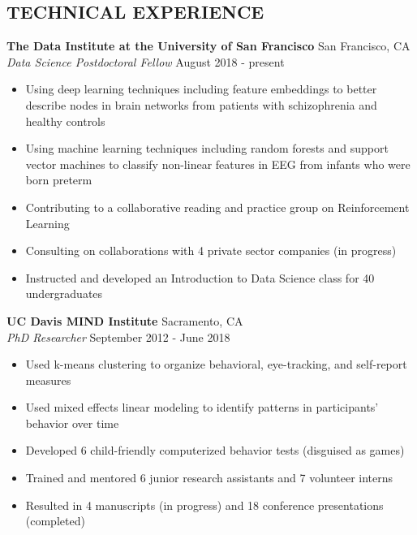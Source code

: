 \documentclass[line,margin,10pt]{res}
\begin{document}
\begin{resume}
\section{TECHNICAL EXPERIENCE}
\textbf{The Data Institute at the University of San Francisco} \hfill San Francisco, CA \\
{\sl Data Science Postdoctoral Fellow} \hfill August 2018 - present
\begin{itemize} \itemsep -2pt
\item Using deep learning techniques including feature embeddings to better describe nodes in brain networks from patients with schizophrenia and healthy controls
\item Using machine learning techniques including random forests and support vector machines to classify non-linear features in EEG from infants who were born preterm
\item Contributing to a collaborative reading and practice group on Reinforcement Learning
\item Consulting on collaborations with 4 private sector companies (in progress)
\item Instructed and developed an Introduction to Data Science class for 40 undergraduates
\end{itemize}

\textbf{UC Davis MIND Institute} \hfill Sacramento, CA \\
{\sl PhD Researcher} \hfill September 2012 - June 2018
\begin{itemize} \itemsep -2pt
\item Used k-means clustering to organize behavioral, eye-tracking, and self-report measures
\item Used mixed effects linear modeling to identify patterns in participants' behavior over time
\item Developed 6 child-friendly computerized behavior tests (disguised as games)
\item Trained and mentored 6 junior research assistants and 7 volunteer interns
\item Resulted in 4 manuscripts (in progress) and 18 conference presentations (completed)
\end{itemize}


\end{resume}
\end{document}
